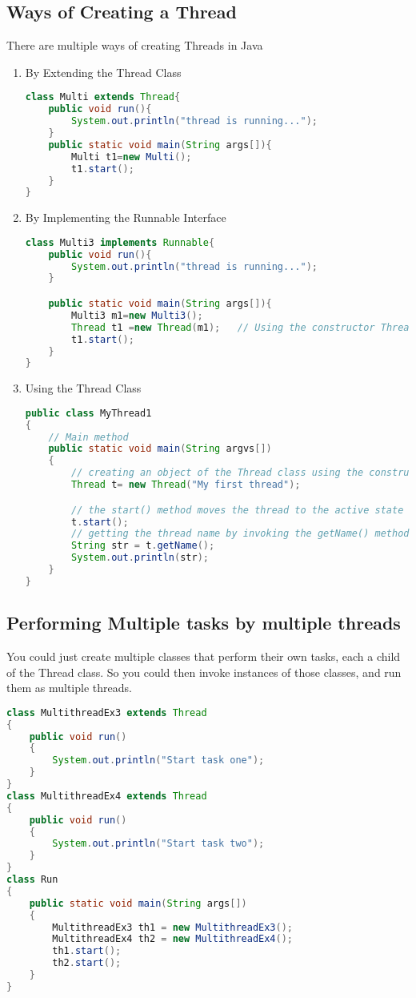 \documentclass[11pt]{article}
\begin{document}
\subsection{Ways of Creating a Thread}
There are multiple ways of creating Threads in Java
\begin{enumerate}
	\item By Extending the Thread Class
	      \begin{lstlisting}[language=Java]
class Multi extends Thread{  
	public void run(){  
		System.out.println("thread is running...");  
	}  
	public static void main(String args[]){  
		Multi t1=new Multi();  
		t1.start();  
	}  
}  		
	\end{lstlisting}
	\item By Implementing the Runnable Interface
	      \begin{lstlisting}[language=Java]
class Multi3 implements Runnable{  
	public void run(){  
		System.out.println("thread is running...");  
	}  

	public static void main(String args[]){  
		Multi3 m1=new Multi3();  
		Thread t1 =new Thread(m1);   // Using the constructor Thread(Runnable r)  
		t1.start();  
	}   
}
	\end{lstlisting}
	\item Using the Thread Class
	      \begin{lstlisting}[language=Java]
public class MyThread1  
{
	// Main method  
	public static void main(String argvs[])  
	{  
		// creating an object of the Thread class using the constructor Thread(String name)   
		Thread t= new Thread("My first thread");  

		// the start() method moves the thread to the active state  
		t.start();  
		// getting the thread name by invoking the getName() method  
		String str = t.getName();  
		System.out.println(str);  
	}  
}  
\end{lstlisting}
\end{enumerate}
\subsection{Performing Multiple tasks by multiple threads}
You could just create multiple classes that perform their own tasks, each a child of the Thread class. So you could then invoke instances of those classes, and run them as multiple threads.

\begin{lstlisting}[language=Java]
class MultithreadEx3 extends Thread  
{  
    public void run()  
    {  
        System.out.println("Start task one");  
    }  
}  
class MultithreadEx4 extends Thread  
{  
    public void run()  
    {  
        System.out.println("Start task two");  
    }  
}  
class Run  
{  
    public static void main(String args[])  
    {  
        MultithreadEx3 th1 = new MultithreadEx3();  
        MultithreadEx4 th2 = new MultithreadEx4();  
        th1.start();  
        th2.start();  
    }  
} 
\end{lstlisting}
\end{document}
